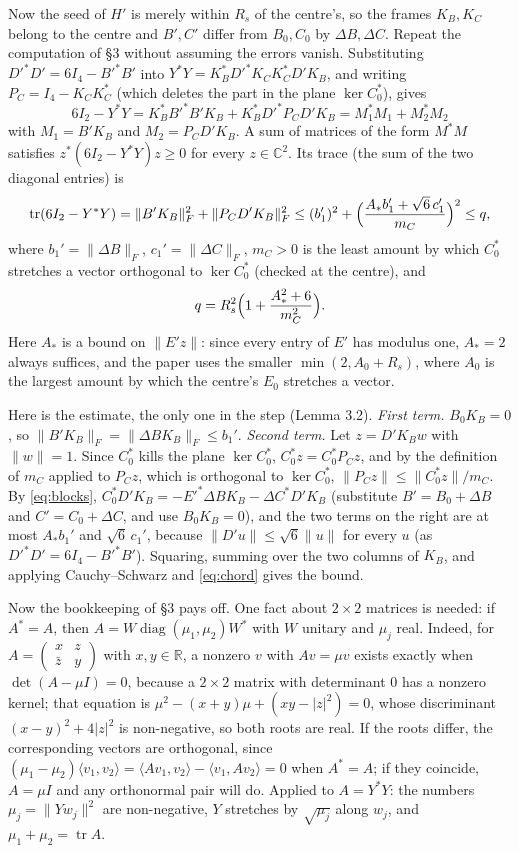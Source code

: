 \documentclass[11pt]{article}
\newcommand{\C}{\mathbb{C}}
\newcommand{\R}{\mathbb{R}}
\newcommand{\inner}[2]{\langle #1,#2\rangle}
\newcommand{\abs}[1]{\lvert #1\rvert}
\newcommand{\norm}[1]{\lVert #1\rVert}
\DeclareMathOperator{\tr}{tr}
\DeclareMathOperator{\diag}{diag}
\begin{document}
Now the seed of $H'$ is merely within $R_s$ of the centre's, so the frames $K_B,K_C$ belong to the
centre and $B',C'$ differ from $B_0,C_0$ by $\Delta B,\Delta C$. Repeat the computation of \S3
without assuming the errors vanish. Substituting $D'^*D'=6I_4-B'^*B'$ into
$Y^*Y=K_B^*D'^*K_CK_C^*D'K_B$, and writing $P_C=I_4-K_CK_C^*$ (which deletes the part in the plane
$\ker C_0^*$), gives
\begin{equation}\label{eq:defect}
6I_2-Y^*Y=K_B^*B'^*B'K_B+K_B^*D'^*P_CD'K_B=M_1^*M_1+M_2^*M_2
\end{equation}
with $M_1=B'K_B$ and $M_2=P_CD'K_B$. A sum of matrices of the form $M^*M$ satisfies
$z^*(6I_2-Y^*Y)z\ge0$ for every $z\in\C^2$. Its trace (the sum of the two diagonal entries) is
\[
\tr(6I_2-Y^*Y)=\norm{B'K_B}_F^2+\norm{P_CD'K_B}_F^2
\le (b_1')^2+\Bigl(\frac{A_*b_1'+\sqrt6\,c_1'}{m_C}\Bigr)^2\le q,
\]
where $b_1'=\norm{\Delta B}_F$, $c_1'=\norm{\Delta C}_F$, $m_C>0$ is the least amount by which
$C_0^*$ stretches a vector orthogonal to $\ker C_0^*$ (checked at the centre), and
\begin{equation}\label{eq:q}
q=R_s^2\Bigl(1+\frac{A_*^2+6}{m_C^2}\Bigr).
\end{equation}
Here $A_*$ is a bound on $\norm{E'z}$: since every entry of $E'$ has modulus one, $A_*=2$ always
suffices, and the paper uses the smaller $\min(2,A_0+R_s)$, where $A_0$ is the largest amount by
which the centre's $E_0$ stretches a vector.

Here is the estimate, the only one in the step (Lemma 3.2). \emph{First term.} $B_0K_B=0$, so
$\norm{B'K_B}_F=\norm{\Delta BK_B}_F\le b_1'$. \emph{Second term.} Let $z=D'K_Bw$ with $\norm w=1$.
Since $C_0^*$ kills the plane $\ker C_0^*$, $C_0^*z=C_0^*P_Cz$, and by the definition of $m_C$
applied to $P_Cz$, which is orthogonal to $\ker C_0^*$, $\norm{P_Cz}\le\norm{C_0^*z}/m_C$. By
\eqref{eq:blocks}, $C_0^*D'K_B=-E'^*\Delta BK_B-\Delta C^*D'K_B$ (substitute $B'=B_0+\Delta B$ and
$C'=C_0+\Delta C$, and use $B_0K_B=0$), and the two terms on the right are at
most $A_*b_1'$ and $\sqrt6\,c_1'$, because $\norm{D'u}\le\sqrt6\norm u$ for every $u$ (as
$D'^*D'=6I_4-B'^*B'$). Squaring, summing over the two columns of $K_B$, and applying Cauchy--Schwarz
and \eqref{eq:chord} gives the bound.

\smallskip
\noindent Now the bookkeeping of \S3 pays off. One fact about $2\times2$ matrices is needed: if $A^*=A$,
then $A=W\diag(\mu_1,\mu_2)W^*$ with $W$ unitary and $\mu_j$ real. Indeed, for
$A=\begin{pmatrix}x&z\\ \bar z&y\end{pmatrix}$ with $x,y\in\R$, a nonzero $v$ with $Av=\mu v$ exists
exactly when $\det(A-\mu I)=0$, because a $2\times2$ matrix with determinant $0$ has a nonzero kernel;
that equation is $\mu^2-(x+y)\mu+(xy-\abs z^2)=0$, whose discriminant $(x-y)^2+4\abs z^2$ is
non-negative, so both roots are real. If the roots differ, the corresponding vectors are orthogonal,
since $(\mu_1-\mu_2)\inner{v_1}{v_2}=\inner{Av_1}{v_2}-\inner{v_1}{Av_2}=0$ when $A^*=A$; if they
coincide, $A=\mu I$ and any orthonormal pair will do. Applied to $A=Y^*Y$: the numbers
$\mu_j=\norm{Yw_j}^2$ are non-negative, $Y$ stretches by $\sqrt{\mu_j}$ along $w_j$, and
$\mu_1+\mu_2=\tr A$.
\end{document}
